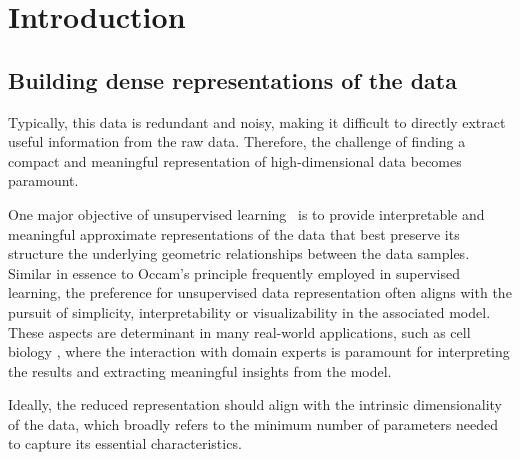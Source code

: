 \chapter{Introduction}
\label{c-intro} %

\minitoc

\section{Building dense representations of the data}


Typically, this data is redundant and noisy, making it difficult to directly extract useful information from the raw data. Therefore, the challenge of finding a compact and meaningful representation of high-dimensional data becomes paramount.


One major objective of unsupervised learning~\citep{Hastie2009} is to provide interpretable and meaningful approximate representations of the data that best preserve its structure \ie the underlying geometric relationships between the data samples.
Similar in essence to Occam's principle frequently employed in supervised learning, the preference for unsupervised data representation often aligns with the pursuit of simplicity, interpretability or visualizability in the associated model.
These aspects are determinant in many real-world applications, such as cell biology
\citep{cantini2021benchmarking, ventre2023one}, where the interaction with domain experts is paramount for interpreting the results and extracting meaningful insights from the model. 

Ideally, the reduced representation should align with the intrinsic dimensionality of the data, which broadly refers to the minimum number of parameters needed to capture its essential characteristics.


